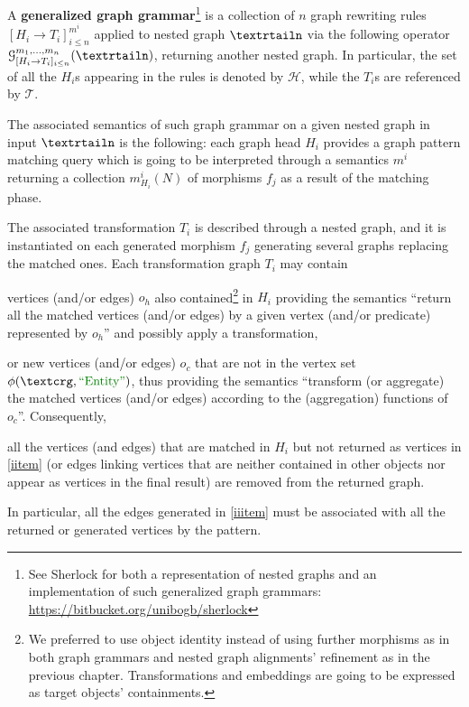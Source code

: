 
\begin{definition}\label{def:gggintro}
A \textbf{generalized graph grammar}\footnote{See Sherlock for both a representation of nested graphs and an implementation of such generalized graph grammars: \url{https://bitbucket.org/unibogb/sherlock}} is a collection of $n$ graph rewriting rules $[H_i\to T_i]_{i\leq n}^{m^i}$ applied to nested graph $\nested$ via the following operator $\mathcal{G}^{m_1,\dots,m_n}_{[H_i\to T_i]_{i\leq n}}(\nested)$, returning another nested graph. In particular, the set of all the $H_i$s appearing in the rules is denoted by $\mathcal{H}$, while the $T_i$s are referenced by $\mathcal{T}$.

The associated semantics of such graph grammar on a given nested graph in input $\nested$ is the following: each graph head $H_i$ provides a graph pattern matching query which is going to be interpreted through a semantics $m^i$ returning a collection $m^i_{H_i}(N)$ of morphisms $f_j$ as a result of the matching phase. 

The associated transformation $T_i$ is described through a nested graph, and it is instantiated on each generated morphism $f_j$ generating several graphs replacing the matched ones. Each transformation graph $T_i$ may contain \begin{mylist}
\item \label{iitem} vertices (and/or edges) $o_h$ also contained\footnote{We preferred to use object identity instead of using further morphisms as in both graph grammars and nested graph alignments' refinement as in the previous chapter. Transformations and embeddings are going to be expressed as target objects' containments.} in $H_i$  providing the semantics ``return all the matched vertices (and/or edges) by a given vertex (and/or predicate) represented by $o_h$'' and possibly apply a transformation,
\item \label{iiitem} or new vertices (and/or edges) $o_c$ that are not in the vertex set $\phi(\ngraph,\ONTA)$, thus providing the semantics ``transform (or aggregate) the matched vertices (and/or edges) according to the (aggregation) functions of $o_c$''. Consequently,
\item \label{iiiitem} all the vertices (and edges) that are matched in $H_i$ but not returned as vertices in \ref{iitem}  (or  edges linking vertices that are neither contained in other objects nor appear as vertices in the final result) are removed from the returned graph.
	\end{mylist} In particular, all the edges generated in \ref{iiitem} must be associated with all the returned or generated vertices by the pattern.
\end{definition}

